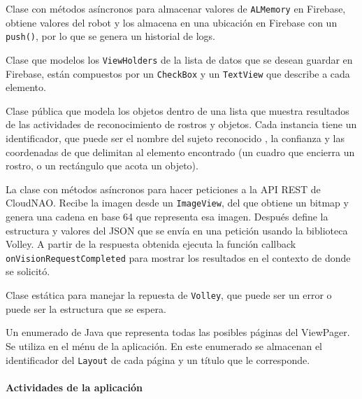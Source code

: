 
Clase con métodos asíncronos para almacenar valores de \texttt{ALMemory} en Firebase, obtiene valores del robot y los almacena en una ubicación en Firebase con un \texttt{push()}, por lo que se genera un historial de logs.


Clase que modelos los \texttt{ViewHolders} de la lista de datos que se desean guardar en Firebase, están compuestos por un \texttt{CheckBox} y un \texttt{TextView} que describe a cada elemento.


Clase pública que modela los objetos dentro de una lista que muestra resultados de las actividades de reconocimiento de rostros y objetos. Cada instancia tiene un identificador, que puede ser el nombre del sujeto reconocido , la confianza y las coordenadas de que delimitan al elemento encontrado (un cuadro que encierra un rostro, o un rectángulo que acota un objeto).


La clase con métodos asíncronos para hacer peticiones a la API REST 
de CloudNAO. Recibe la imagen desde un \texttt{ImageView}, del que obtiene un 
bitmap y genera una cadena en base 64 que representa esa imagen. 
Después define la estructura y valores del JSON que se envía en una 
petición usando la biblioteca Volley. A partir de la respuesta 
obtenida ejecuta la función callback \texttt{onVisionRequestCompleted} 
para mostrar los resultados en el contexto de donde se solicitó.




Clase estática para manejar la repuesta de \texttt{Volley}, que puede ser un error o puede ser la estructura que se espera.


Un enumerado de Java que representa todas las posibles páginas del ViewPager. Se utiliza en el ménu de la aplicación. En este enumerado se almacenan el identificador del \texttt{Layout} de cada página y un título que le corresponde.


\paragraph{Actividades de la aplicación}


